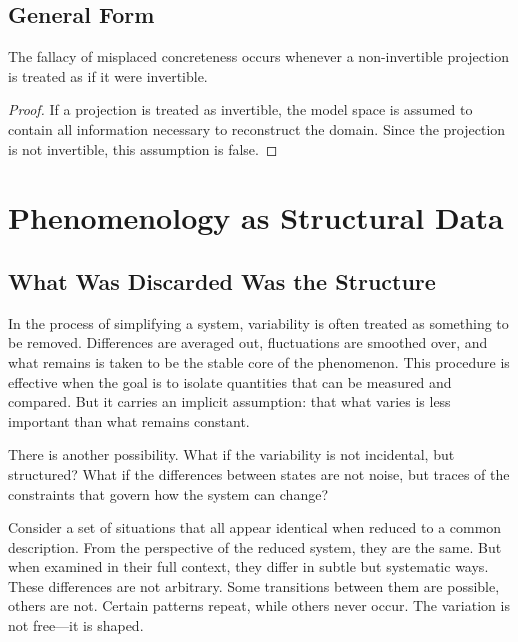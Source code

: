 \documentclass[11pt,openany]{book}
\begin{document}
\section{General Form}
\label{sec:unified}

\begin{proposition}
The fallacy of misplaced concreteness occurs whenever a
non-invertible projection is treated as if it were
invertible.
\end{proposition}

\begin{proof}
If a projection is treated as invertible, the model space
is assumed to contain all information necessary to
reconstruct the domain. Since the projection is not
invertible, this assumption is false.
\end{proof}


\chapter{Phenomenology as Structural Data}
\label{ch:phenomenology}

\section*{ What Was Discarded Was the Structure}

In the process of simplifying a system, variability is often treated as something to be removed. Differences are averaged out, fluctuations are smoothed over, and what remains is taken to be the stable core of the phenomenon. This procedure is effective when the goal is to isolate quantities that can be measured and compared. But it carries an implicit assumption: that what varies is less important than what remains constant.

There is another possibility. What if the variability is not incidental, but structured? What if the differences between states are not noise, but traces of the constraints that govern how the system can change?

Consider a set of situations that all appear identical when reduced to a common description. From the perspective of the reduced system, they are the same. But when examined in their full context, they differ in subtle but systematic ways. These differences are not arbitrary. Some transitions between them are possible, others are not. Certain patterns repeat, while others never occur. The variation is not free—it is shaped.
\end{document}
